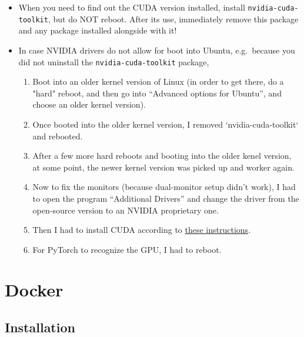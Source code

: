\documentclass[12pt, a4paper]{scrbook}
\numberwithin{equation}{section}
\theoremstyle{definition}
\theoremstyle{definition}
\begin{document}
	\begin{itemize}
		\item When you need to find out the CUDA version installed, install \texttt{nvidia-cuda-toolkit}, but do NOT reboot. After its use, immediately remove this package and any package installed alongside with it!
		
		\item In case NVIDIA drivers do not allow for boot into Ubuntu, e.g.~because you did not uninstall the \texttt{nvidia-cuda-toolkit} package,
		
		\begin{enumerate}
			\item Boot into an older kernel version of Linux (in order to get there, do a "hard" reboot, and then go into 
			\enquote{Advanced options for Ubuntu}, and choose an older kernel version). 
			\item Once booted into the older kernel version, I removed `nvidia-cuda-toolkit` and rebooted. 
			\item After a few more hard reboots and booting into the older kenel version, at some point, the newer kernel 
			version was picked up and worker again. 
			\item Now to fix the monitors (because dual-monitor setup didn't work), I had to open the program 
			\enquote{Additional Drivers} and change the driver from the open-source version to an NVIDIA proprietary one. 
			\item Then I had to install CUDA according to \href{https://docs.nvidia.com/cuda/cuda-installation-guide-linux/index.html}{these instructions}. 
			\item For PyTorch to recognize the GPU, I had to reboot. 
		\end{enumerate}
		
	\end{itemize}
	
	\chapter{Docker}
	
	\section{Installation}
	
\end{document}
